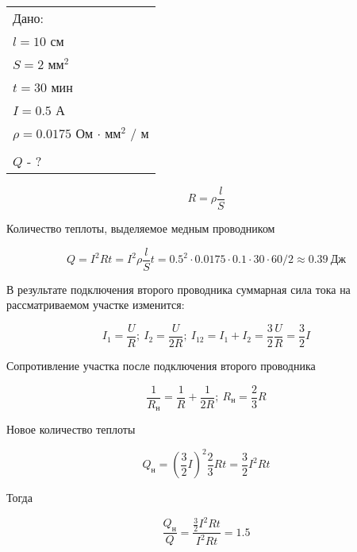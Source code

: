 \solutionSection

\begin{tabular}{l|}
    Дано: \\
    $l = 10$ см \\
    $S = 2$ мм$^2$ \\
    $t = 30$ мин \\
    $I = 0.5$ А \\
    $\rho = 0.0175$ Ом $\cdot$ мм$^2$ / м \\
    \hline \\
    $Q$ - ?
\end{tabular}

$$R = \rho \frac{l}{S}$$

Количество теплоты, выделяемое медным проводником 

$$Q = I^2 R t = I^2 \rho \frac{l}{S} t = 0.5^2 \cdot 0.0175 \cdot 0.1 \cdot 30 \cdot 60 / 2 \approx 0.39 \: \text{Дж}$$
 
В результате подключения второго проводника суммарная сила тока на рассматриваемом участке изменится:

$$I_1 = \frac{U}{R}; \: I_2 = \frac{U}{2R}; \: I_{12} = I_1 + I_2 = \frac{3}{2} \frac{U}{R} = \frac{3}{2} I$$

Сопротивление участка после подключения второго проводника

$$\frac{1}{R_\text{н}} = \frac{1}{R} + \frac{1}{2R}; \: R_\text{н} = \frac{2}{3} R$$
 
Новое количество теплоты

$$Q_\text{н} = \left( \frac{3}{2} I \right)^2 \frac{2}{3}Rt = \frac{3}{2}I^2Rt$$
 
Тогда

$$\frac{Q_\text{н}}{Q} = \frac{\frac{3}{2}I^2Rt}{I^2Rt} = 1.5$$

